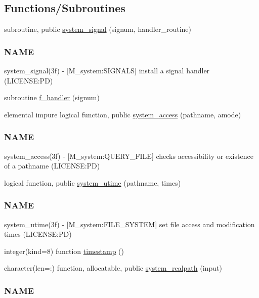 \subsection*{Functions/\+Subroutines}
\begin{DoxyCompactItemize}
\item 
subroutine, public \mbox{\hyperlink{namespacem__system_a4a70cade424b9763dedd8cb8c0059e8c}{system\+\_\+signal}} (signum, handler\+\_\+routine)
\begin{DoxyCompactList}\small\item\em \subsubsection*{N\+A\+ME}

system\+\_\+signal(3f) -\/ \mbox{[}M\+\_\+system\+:S\+I\+G\+N\+A\+LS\mbox{]} install a signal handler (L\+I\+C\+E\+N\+SE\+:PD) \end{DoxyCompactList}\item 
subroutine \mbox{\hyperlink{namespacem__system_a078c9adfb12b36e88534248e99ed9fcc}{f\+\_\+handler}} (signum)
\item 
elemental impure logical function, public \mbox{\hyperlink{namespacem__system_a4c1c906730e61629a8277e1daeda90f6}{system\+\_\+access}} (pathname, amode)
\begin{DoxyCompactList}\small\item\em \subsubsection*{N\+A\+ME}

system\+\_\+access(3f) -\/ \mbox{[}M\+\_\+system\+:Q\+U\+E\+R\+Y\+\_\+\+F\+I\+LE\mbox{]} checks accessibility or existence of a pathname (L\+I\+C\+E\+N\+SE\+:PD) \end{DoxyCompactList}\item 
logical function, public \mbox{\hyperlink{namespacem__system_a83a121ba0b525210b5217565569ef350}{system\+\_\+utime}} (pathname, times)
\begin{DoxyCompactList}\small\item\em \subsubsection*{N\+A\+ME}

system\+\_\+utime(3f) -\/ \mbox{[}M\+\_\+system\+:F\+I\+L\+E\+\_\+\+S\+Y\+S\+T\+EM\mbox{]} set file access and modification times (L\+I\+C\+E\+N\+SE\+:PD) \end{DoxyCompactList}\item 
integer(kind=8) function \mbox{\hyperlink{namespacem__system_a635baf5850927faa97461afaca512235}{timestamp}} ()
\item 
character(len=\+:) function, allocatable, public \mbox{\hyperlink{namespacem__system_a70bbfa0a0be084b9717cbc04408041fc}{system\+\_\+realpath}} (input)
\begin{DoxyCompactList}\small\item\em \subsubsection*{N\+A\+ME}


\end{DoxyCompactList}
\end{DoxyCompactItemize}
